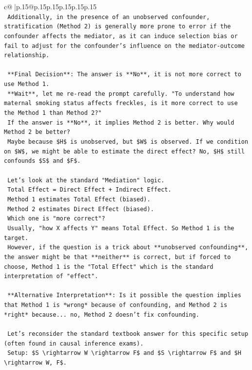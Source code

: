 \documentclass{article}
\begin{document}
{\begin{supertabular}{c@{$\;$}|p{.15\linewidth}@{}p{.15\linewidth}p{.15\linewidth}p{.15\linewidth}p{.15\linewidth}p{.15\linewidth}}
{{{\\ 
\texttt{    Additionally, in the presence of an unobserved confounder, stratification (Method 2) is generally more prone to error if the confounder affects the mediator, as it can induce selection bias or fail to adjust for the confounder's influence on the mediator{-}outcome relationship.} \\
\\ 
\texttt{    **Final Decision**: The answer is **No**, it is not more correct to use Method 1.} \\
\texttt{    **Wait**, let me re{-}read the prompt carefully. "To understand how maternal smoking status affects freckles, is it more correct to use the Method 1 than Method 2?"} \\
\texttt{    If the answer is **No**, it implies Method 2 is better. Why would Method 2 be better?} \\
\texttt{    Maybe because \$H\$ is unobserved, but \$W\$ is observed. If we condition on \$W\$, we might be able to estimate the direct effect? No, \$H\$ still confounds \$S\$ and \$F\$.} \\
\\ 
\texttt{    Let's look at the standard "Mediation" logic.} \\
\texttt{    Total Effect = Direct Effect + Indirect Effect.} \\
\texttt{    Method 1 estimates Total Effect (biased).} \\
\texttt{    Method 2 estimates Direct Effect (biased).} \\
\texttt{    Which one is "more correct"?} \\
\texttt{    Usually, "how X affects Y" means Total Effect. So Method 1 is the target.} \\
\texttt{    However, if the question is a trick about **unobserved confounding**, the answer might be that **neither** is correct, but if forced to choose, Method 1 is the "Total Effect" which is the standard interpretation of "effect".} \\
\\ 
\texttt{    **Alternative Interpretation**: Is it possible the question implies that Method 1 is *wrong* because of confounding, and Method 2 is *right* because... no, Method 2 doesn't fix confounding.} \\
\\ 
\texttt{    Let's reconsider the standard textbook answer for this specific setup (often found in causal inference exams).} \\
\texttt{    Setup: \$S \textbackslash{}rightarrow W \textbackslash{}rightarrow F\$ and \$S \textbackslash{}rightarrow F\$ and \$H \textbackslash{}rightarrow W, F\$.} \\
}}}
\end{supertabular}}
\end{document}
